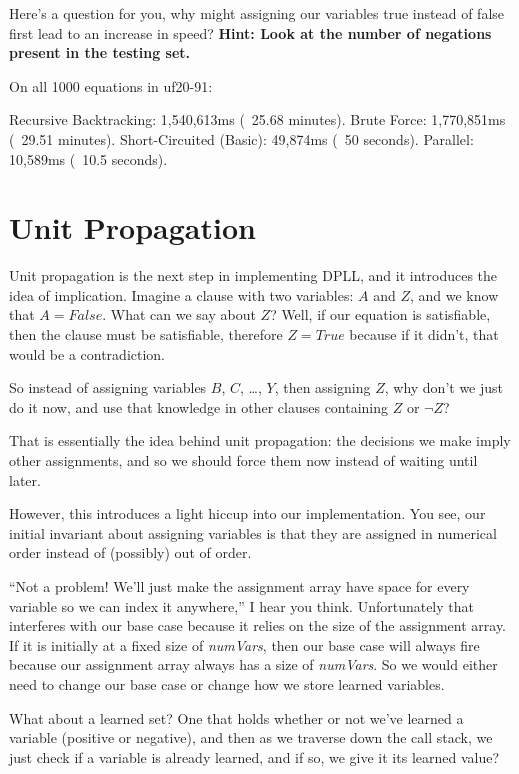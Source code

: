 \documentclass[../main.tex]{subfiles}
\begin{document}
Here's a question for you, why might assigning our variables true instead of
false first lead to an increase in speed? \textbf{Hint: Look at the number of negations 
present in the testing set.}

\begin{FVerbatim}
On all 1000 equations in uf20-91:

Recursive Backtracking:    1,540,613ms (~25.68 minutes).
Brute Force:               1,770,851ms (~29.51 minutes).
Short-Circuited (Basic):   49,874ms (~50 seconds).
Parallel:                  10,589ms (~10.5 seconds).
\end{FVerbatim}

\section{Unit Propagation}

Unit propagation is the next step in implementing DPLL, and it introduces the
idea of implication. Imagine a clause with two variables: $A$ and $Z$,
and we know that $A = False$. What can we say about $Z$? Well, if our equation is satisfiable, 
then the clause must be satisfiable, therefore $Z = True$ because if it didn't, 
that would be a contradiction.

So instead of assigning variables $B$, $C$, \ldots, $Y$, then assigning $Z$,
why don't we just do it now, and use that knowledge in other clauses
containing $Z$ or $\neg Z$?

That is essentially the idea behind unit propagation: the decisions we make
imply other assignments, and so we should force them now instead of waiting
until later.

However, this introduces a light hiccup into our implementation. You see, 
our initial invariant about assigning variables is that they are
assigned in numerical order instead of (possibly) out of order.

``Not a problem! We'll just make the assignment array have space for every
variable so we can index it anywhere,'' I hear you think. Unfortunately that interferes with
our base case because it relies on the size
of the assignment array. If it is initially at a fixed size of
\textit{numVars}, then our base case will always fire because our assignment
array always has a size of \textit{numVars}. So we would either need to
change our base case or change how we store learned variables.

What about a learned set? One that holds whether or not we've learned a
variable (positive or negative), and then as we traverse down the call stack,
we just check if a variable is already learned, and if so, we give it its learned
value?
\end{document}
